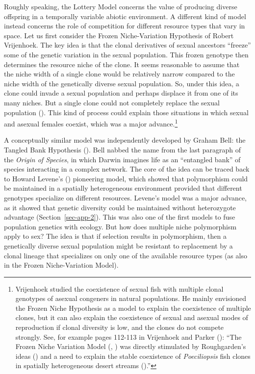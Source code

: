 \documentclass[
  letterpaper,
]{book}
\begin{document}
Roughly speaking, the Lottery Model concerns the value of producing
diverse offspring in a temporally variable abiotic environment. A
different kind of model instead concerns the role of competition for
different resource types that vary in space. Let us first consider the
Frozen Niche-Variation Hypothesis of Robert Vrijenhoek. The key idea is
that the clonal derivatives of sexual ancestors ``freeze'' some of the
genetic variation in the sexual population. This frozen genotype then
determines the resource niche of the clone. It seems reasonable to
assume that the niche width of a single clone would be relatively narrow
compared to the niche width of the genetically diverse sexual
population. So, under this idea, a clone could invade a sexual
population and perhaps displace it from one of its many niches. But a
single clone could not completely replace the sexual population
(). This kind of process
could explain those situations in which sexual and asexual females
coexist, which was a major advance.\footnote{Vrijenhoek studied the
  coexistence of sexual fish with multiple clonal genotypes of asexual
  congeners in natural populations. He mainly envisioned the Frozen
  Niche Hypothesis as a model to explain the coexistence of multiple
  clones, but it can also explain the coexistence of sexual and asexual
  modes of reproduction if clonal diversity is low, and the clones do
  not compete strongly. See, for example pages 112-113 in Vrijenhoek and
  Parker (): ``The Frozen Niche
  Variation Model (,
  ) was directly stimulated by
  Roughgarden's ideas () and a need
  to explain the stable coexistence of \emph{Poeciliopsis} fish clones
  in spatially heterogeneous desert streams
  ().''}

A conceptually similar model was independently developed by Graham Bell:
the Tangled Bank Hypothesis (). Bell
nabbed the name from the last paragraph of the \emph{Origin of Species},
in which Darwin imagines life as an ``entangled bank'' of species
interacting in a complex network. The core of the idea can be traced
back to Howard Levene's () pioneering
model, which showed that polymorphism could be maintained in a spatially
heterogeneous environment provided that different genotypes specialize
on different resources. Levene's model was a major advance, as it showed
that genetic diversity could be maintained without heterozygote
advantage (Section~\ref{sec-app-2}). This was also one of the first
models to fuse population genetics with ecology. But how does multiple
niche polymorphism apply to sex? The idea is that if selection results
in polymorphism, then a genetically diverse sexual population might be
resistant to replacement by a clonal lineage that specializes on only
one of the available resource types (as also in the Frozen
Niche-Variation Model).
\end{document}
